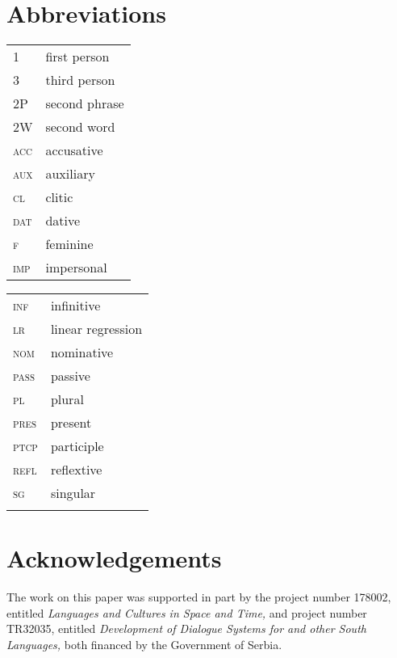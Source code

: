 \documentclass[output=paper,modfonts,newtxmath,hidelinks,]{langscibook}
\begin{document}
\section*{Abbreviations}

\begin{tabularx}{.5\textwidth}{@{}lQ@{}}
\textsc{1}&first person\\
\textsc{3}&third person\\
2P&second phrase\\
2W&second word\\
\textsc{acc}&{accusative}\\
\textsc{aux}&auxiliary\\
\textsc{cl}&{clitic}\\
\textsc{dat}&{dative}\\
\textsc{f}&{feminine}\\
\textsc{imp}&impersonal\\
\end{tabularx}%
\begin{tabularx}{.5\textwidth}{@{}lQ@{}}
\textsc{inf}&{infinitive}\\
\textsc{lr}&linear regression\\
\textsc{nom}&{nominative}\\
\textsc{pass}&passive\\
\textsc{pl}&{plural}\\
 \textsc{pres}&present\\
\textsc{ptcp}&{participle}\\
\textsc{refl}&reflextive\\
\textsc{sg}&singular\\
&\\
\end{tabularx}

\section*{Acknowledgements}

The work on this paper was supported in part by the project number 178002, entitled \textit{Languages and Cultures in Space and Time,} and project number TR32035, entitled \textit{Development of Dialogue Systems for  and other South  Languages,} both financed by the Government of Serbia.
\sloppy
\printbibliography[heading=subbibliography,notkeyword=this]
\end{document}
